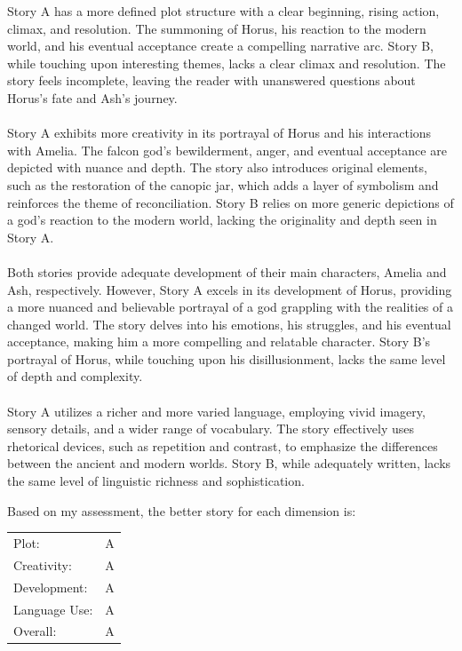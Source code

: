 \documentclass{article}
\begin{document}
\begin{tcolorbox}[colback=white, colframe=my-yellow, coltitle=black, parskip=5mm, title=
\textbf{\textsc{[LLM Evaluator]} Example Output}, breakable]
Story A has a more defined plot structure with a clear beginning, rising action, climax, and resolution. The summoning of Horus, his reaction to the modern world, and his eventual acceptance create a compelling narrative arc. Story B, while touching upon interesting themes, lacks a clear climax and resolution. The story feels incomplete, leaving the reader with unanswered questions about Horus's fate and Ash's journey.\\
\quad \\
Story A exhibits more creativity in its portrayal of Horus and his interactions with Amelia. The falcon god's bewilderment, anger, and eventual acceptance are depicted with nuance and depth. The story also introduces original elements, such as the restoration of the canopic jar, which adds a layer of symbolism and reinforces the theme of reconciliation. Story B relies on more generic depictions of a god's reaction to the modern world, lacking the originality and depth seen in Story A.\\
\quad \\
Both stories provide adequate development of their main characters, Amelia and Ash, respectively. However, Story A excels in its development of Horus, providing a more nuanced and believable portrayal of a god grappling with the realities of a changed world. The story delves into his emotions, his struggles, and his eventual acceptance, making him a more compelling and relatable character. Story B's portrayal of Horus, while touching upon his disillusionment, lacks the same level of depth and complexity.\\
\quad \\
Story A utilizes a richer and more varied language, employing vivid imagery, sensory details, and a wider range of vocabulary. The story effectively uses rhetorical devices, such as repetition and contrast, to emphasize the differences between the ancient and modern worlds. Story B, while adequately written, lacks the same level of linguistic richness and sophistication.

\medskip 
\begin{center}
Based on my assessment, the better story for each dimension is:\\
\medskip
\begin{tabular}{ll}
Plot: & A\\
Creativity: & A\\
Development: & A\\
Language Use: &A\\
Overall: &A
\end{tabular}
\end{center}
\end{tcolorbox}
\end{document}
